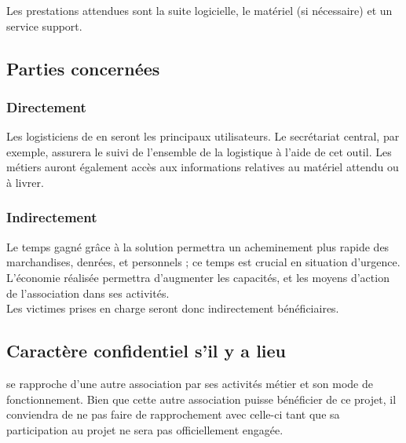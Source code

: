 Les prestations attendues sont la suite logicielle, le matériel (si nécessaire) et un service support.

\subsection{Parties concernées}

\subsubsection{Directement}
Les logisticiens de \mo en seront les principaux utilisateurs. Le secrétariat central, par exemple, assurera le suivi de l'ensemble de la logistique à l'aide de cet outil.
Les métiers auront également accès aux informations relatives au matériel attendu ou à livrer.

\subsubsection{Indirectement}
Le temps gagné grâce à la solution permettra un acheminement plus rapide des marchandises, denrées, et personnels ; ce temps est crucial en situation d'urgence. L'économie réalisée permettra d'augmenter les capacités, et les moyens d'action de l'association dans ses activités.
\\
Les victimes prises en charge seront donc indirectement bénéficiaires.


\subsection{Caractère confidentiel s'il y a lieu}
\mo se rapproche d'une autre association par ses activités métier et son mode de fonctionnement. Bien que cette autre association puisse bénéficier de ce projet, il conviendra de ne pas faire de rapprochement avec celle-ci tant que sa participation au projet ne sera pas officiellement engagée.

